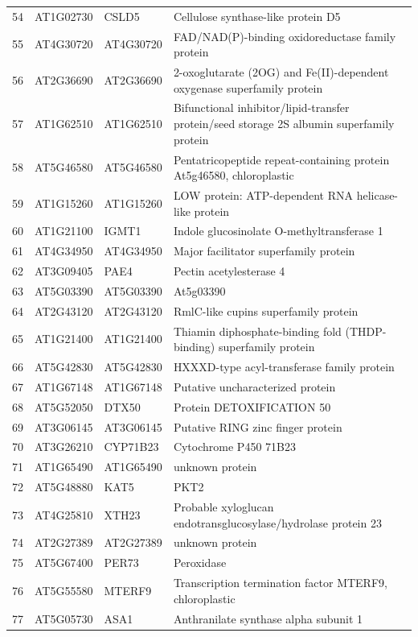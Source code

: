 \documentclass[11pt]{article}
\begin{document}
\begin{center}
\begin{tabular}{rlll}
54 & AT1G02730 & CSLD5 & Cellulose synthase-like protein D5\\
55 & AT4G30720 & AT4G30720 & FAD/NAD(P)-binding oxidoreductase family protein\\
56 & AT2G36690 & AT2G36690 & 2-oxoglutarate (2OG) and Fe(II)-dependent oxygenase superfamily protein\\
57 & AT1G62510 & AT1G62510 & Bifunctional inhibitor/lipid-transfer protein/seed storage 2S albumin superfamily protein\\
58 & AT5G46580 & AT5G46580 & Pentatricopeptide repeat-containing protein At5g46580, chloroplastic\\
59 & AT1G15260 & AT1G15260 & LOW protein: ATP-dependent RNA helicase-like protein\\
60 & AT1G21100 & IGMT1 & Indole glucosinolate O-methyltransferase 1\\
61 & AT4G34950 & AT4G34950 & Major facilitator superfamily protein\\
62 & AT3G09405 & PAE4 & Pectin acetylesterase 4\\
63 & AT5G03390 & AT5G03390 & At5g03390\\
64 & AT2G43120 & AT2G43120 & RmlC-like cupins superfamily protein\\
65 & AT1G21400 & AT1G21400 & Thiamin diphosphate-binding fold (THDP-binding) superfamily protein\\
66 & AT5G42830 & AT5G42830 & HXXXD-type acyl-transferase family protein\\
67 & AT1G67148 & AT1G67148 & Putative uncharacterized protein\\
68 & AT5G52050 & DTX50 & Protein DETOXIFICATION 50\\
69 & AT3G06145 & AT3G06145 & Putative RING zinc finger protein\\
70 & AT3G26210 & CYP71B23 & Cytochrome P450 71B23\\
71 & AT1G65490 & AT1G65490 & unknown protein\\
72 & AT5G48880 & KAT5 & PKT2\\
73 & AT4G25810 & XTH23 & Probable xyloglucan endotransglucosylase/hydrolase protein 23\\
74 & AT2G27389 & AT2G27389 & unknown protein\\
75 & AT5G67400 & PER73 & Peroxidase\\
76 & AT5G55580 & MTERF9 & Transcription termination factor MTERF9, chloroplastic\\
77 & AT5G05730 & ASA1 & Anthranilate synthase alpha subunit 1\\

\end{tabular}
\end{center}
\end{document}
